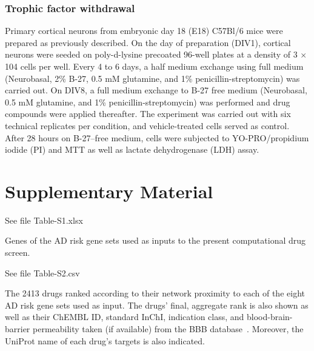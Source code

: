 \documentclass[letterpaper]{article}
\begin{document}
\subsubsection{Trophic factor withdrawal}

Primary cortical neurons from embryonic day 18 (E18) C57Bl/6 mice were
prepared as previously described. On the day of preparation (DIV1), cortical
neurons were seeded on poly-d-lysine precoated 96-well plates at a density of
3 $\times$ 104 cells per well. Every 4 to 6 days, a half medium exchange using full
medium (Neurobasal, 2\% B-27, 0.5 mM glutamine, and 1\% penicillin-streptomycin)
was carried out. On DIV8, a full medium exchange to B-27 free medium
(Neurobasal, 0.5 mM glutamine, and 1\% penicillin-streptomycin) was performed
and drug compounds were applied thereafter. The experiment was carried out
with six technical replicates per condition, and vehicle-treated cells
served as control. After 28 hours on B-27–free medium, cells were subjected to
YO-PRO/propidium iodide (PI) and MTT as well as lactate dehydrogenase (LDH)
assay.




\newpage

\section*{Supplementary Material}

\setcounter{table}{0}
\makeatletter 
\renewcommand{\tablename}{Table S} %
\makeatother

\setcounter{figure}{0}
\makeatletter 
\renewcommand{\figurename}{Figure S} %
\makeatother

\begin{table}[p]
  See file Table-S1.xlsx
\caption{
  Genes of the AD risk gene sets used as inputs to the present computational drug screen.
}
\label{tab:genes-in-genesets}
\end{table}

\begin{table}[p]
  See file Table-S2.csv
\caption{
  The 2413 drugs ranked according to their network proximity to each of the eight
  AD risk gene sets used as input.  The drugs' final, aggregate rank is also shown
  as well as their ChEMBL ID, standard InChI, indication class, and
  blood-brain-barrier permeability taken (if available) from the BBB
  database~\citep{Meng2021}.  Moreover, the UniProt name of each drug's
  targets is also indicated.
}
\label{tab:ranked-drugs}
\end{table}
\end{document}

